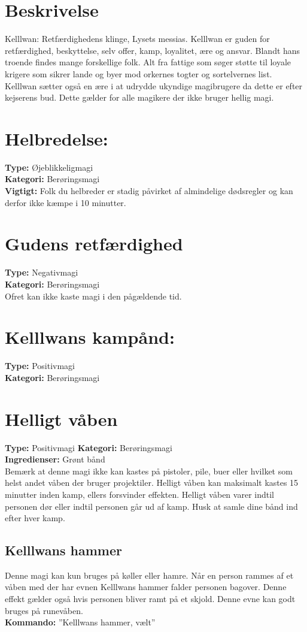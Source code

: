 \section{Beskrivelse}
Kelllwan: Retfærdighedens klinge, Lysets messias. Kelllwan er guden for retfærdighed, beskyttelse, selv offer, kamp, loyalitet, ære og ansvar. Blandt hans troende findes mange forskellige folk. Alt fra fattige som søger støtte til loyale krigere som sikrer lande og byer mod orkernes togter og sortelvernes list. Kelllwan sætter også en ære i at udrydde ukyndige magibrugere da dette er efter kejserens bud. Dette gælder for alle magikere der ikke bruger hellig magi.

\section{Helbredelse:}
\textbf{Type:} Øjeblikkeligmagi\\ 
\textbf{Kategori:} Berøringsmagi\\
\textbf{Vigtigt:} Folk du helbreder er stadig påvirket af almindelige dødsregler og kan derfor ikke kæmpe i 10 minutter.

\section{Gudens retfærdighed}
\textbf{Type:} Negativmagi\\ 
\textbf{Kategori:} Berøringsmagi\\
Ofret kan ikke kaste magi i den pågældende tid.

\section{Kelllwans kampånd:}
\textbf{Type:} Positivmagi\\ 
\textbf{Kategori:} Berøringsmagi\\

\section{Helligt våben}
\textbf{Type:} Positivmagi
\textbf{Kategori:} Berøringsmagi\\
\textbf{Ingredienser:} Grønt bånd\\
Bemærk at denne magi ikke kan kastes på pistoler, pile, buer eller hvilket som helst andet våben der bruger projektiler. Helligt våben kan maksimalt kastes 15 minutter inden kamp, ellers forsvinder effekten. Helligt våben varer indtil personen dør eller indtil personen går ud af kamp. Husk at samle
dine bånd ind efter hver kamp.\\

\subsection{Kelllwans hammer}
Denne magi kan kun bruges på køller eller hamre. Når en person rammes af et våben med der har evnen Kelllwans hammer falder personen bagover. Denne effekt gælder også hvis personen bliver ramt på et skjold. Denne evne kan godt bruges på runevåben.\\ 
\textbf{Kommando:} ”Kelllwans hammer, vælt”
